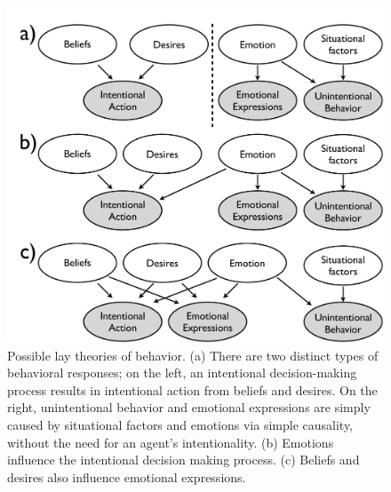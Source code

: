 \documentclass[10pt,letterpaper]{article}
\newcommand{\ndg}[1]{\textcolor{Green}{[ndg: #1]}}
\begin{document}




\begin{figure}[htb!]
\begin{center}
\includegraphics[width=1\columnwidth]{images/model1.pdf} 
\end{center}
\caption{ Possible lay theories of behavior. (a) There are two distinct types of behavioral responses; on the left, an intentional decision-making process results in intentional action from beliefs and desires. On the right, unintentional behavior and emotional expressions are simply caused by situational factors and emotions via simple causality, without the need for an agent's intentionality. (b) Emotions influence the intentional decision making process. (c) Beliefs and desires also influence emotional expressions. }
\label{ModelsOfBehaviorFig}
\end{figure}


\end{document}
